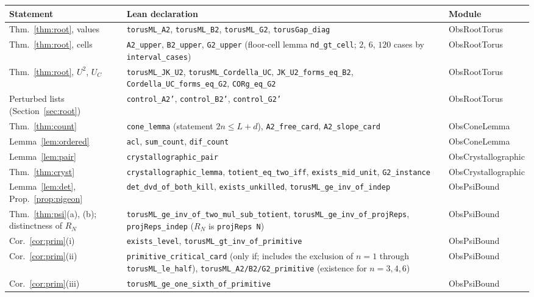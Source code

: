 \documentclass[11pt]{amsart}
\theoremstyle{definition}
\theoremstyle{remark}
\newcommand{\lean}[1]{\texttt{#1}}
\begin{document}
\begin{center}
\small
\begin{tabular}{@{}L{2.8cm}L{6.7cm}L{3.2cm}@{}}
\toprule
Statement & Lean declaration & Module\\
\midrule
Thm.~\ref{thm:root}, values & \lean{torusML\_A2}, \lean{torusML\_B2}, \lean{torusML\_G2}, \lean{torusGap\_diag} & ObsRootTorus\\
Thm.~\ref{thm:root}, cells & \lean{A2\_upper}, \lean{B2\_upper}, \lean{G2\_upper} (floor-cell lemma \lean{nd\_gt\_cell}; $2$, $6$, $120$ cases by \lean{interval\_cases}) & ObsRootTorus\\
Thm.~\ref{thm:root}, $U^2$, $U_C$ & \lean{torusML\_JK\_U2}, \lean{torusML\_Cordella\_UC}, \lean{JK\_U2\_forms\_eq\_B2}, \lean{Cordella\_UC\_forms\_eq\_G2}, \lean{CORg\_eq\_G2} & ObsRootTorus\\
Perturbed lists (Section~\ref{sec:root}) & \lean{control\_A2'}, \lean{control\_B2'}, \lean{control\_G2'} & ObsRootTorus\\
Thm.~\ref{thm:count} & \lean{cone\_lemma} (statement $2n\le L+d$), \lean{A2\_free\_card}, \lean{A2\_slope\_card} & ObsConeLemma\\
Lemma~\ref{lem:ordered} & \lean{acl}, \lean{sum\_count}, \lean{dif\_count} & ObsConeLemma\\
Lemma~\ref{lem:pair} & \lean{crystallographic\_pair} & ObsCrystallographic\\
Thm.~\ref{thm:cryst} & \lean{crystallographic\_lemma}, \lean{totient\_eq\_two\_iff}, \lean{exists\_mid\_unit}, \lean{G2\_instance} & ObsCrystallographic\\
Lemma~\ref{lem:det}, Prop.~\ref{prop:pigeon} & \lean{det\_dvd\_of\_both\_kill}, \lean{exists\_unkilled}, \lean{torusML\_ge\_inv\_of\_indep} & ObsPsiBound\\
Thm.~\ref{thm:psi}(a), (b); distinctness of $R_N$ & \lean{torusML\_ge\_inv\_of\_two\_mul\_sub\_totient}, \lean{torusML\_ge\_inv\_of\_projReps}, \lean{projReps\_indep} ($R_N$ is \lean{projReps N}) & ObsPsiBound\\
Cor.~\ref{cor:prim}(i) & \lean{exists\_level}, \lean{torusML\_gt\_inv\_of\_primitive} & ObsPsiBound\\
Cor.~\ref{cor:prim}(ii) & \lean{primitive\_critical\_card} (only if; includes the exclusion of $n=1$ through \lean{torusML\_le\_half}), \lean{torusML\_A2/B2/G2\_primitive} (existence for $n=3,4,6$) & ObsPsiBound\\
Cor.~\ref{cor:prim}(iii) & \lean{torusML\_ge\_one\_sixth\_of\_primitive} & ObsPsiBound\\

\end{tabular}
\end{center}
\end{document}
